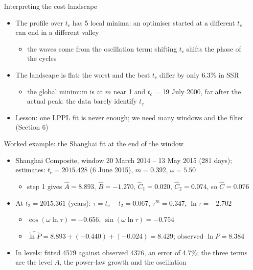 \begin{frame}{Interpreting the cost landscape}
\itemsize{\small}
\begin{itemize}
    \item The profile over $t_c$ has 5 local minima: an optimiser started at a different $t_c$ can end in a different valley
    \begin{itemize}
        \item the waves come from the oscillation term: shifting $t_c$ shifts the phase of the cycles
    \end{itemize}
    \item The landscape is flat: the worst and the best $t_c$ differ by only 6.3\% in SSR
    \begin{itemize}
        \item the global minimum is at $m$ near 1 and $t_c$ = 19 July 2000, far after the actual peak: the data barely identify $t_c$
    \end{itemize}
    \item Lesson: one LPPL fit is never enough; we need many windows and the filter (Section 6)
\end{itemize}
\end{frame}

\begin{frame}{Worked example: the Shanghai fit at the end of the window}
\itemsize{\footnotesize}
\begin{itemize}
    \item Shanghai Composite, window 20 March 2014 -- 13 May 2015 (281 days); estimates: $t_c = 2015.428$ (6 June 2015), $m = 0.392$, $\omega = 5.50$
    \begin{itemize}
        \item step 1 gives $\hat A = 8.893$, $\hat B = -1.270$, $\hat C_1 = 0.020$, $\hat C_2 = 0.074$, so $\hat C = 0.076$
    \end{itemize}
    \item At $t_2 = 2015.361$ (years): $\tau = t_c - t_2 = 0.067$, $\tau^m = 0.347$, $\ln\tau = -2.702$
    \begin{itemize}
        \item $\cos(\omega\ln\tau) = -0.656$, $\sin(\omega\ln\tau) = -0.754$
        \item $\widehat{\ln P} = 8.893 + (-0.440) + (-0.024) = 8.429$; observed $\ln P = 8.384$
    \end{itemize}
    \item In levels: fitted 4579 against observed 4376, an error of 4.7\%; the three terms are the level $A$, the power-law growth and the oscillation
\end{itemize}
\end{frame}

